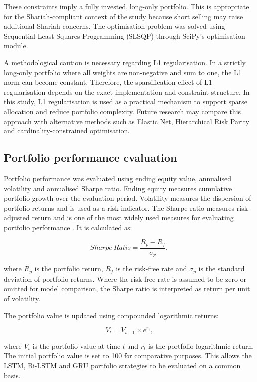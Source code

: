 These constraints imply a fully invested, long-only portfolio. This is appropriate for the Shariah-compliant context of the study because short selling may raise additional Shariah concerns. The optimisation problem was solved using Sequential Least Squares Programming (SLSQP) through SciPy's optimisation module.

A methodological caution is necessary regarding L1 regularisation. In a strictly long-only portfolio where all weights are non-negative and sum to one, the L1 norm can become constant. Therefore, the sparsification effect of L1 regularisation depends on the exact implementation and constraint structure. In this study, L1 regularisation is used as a practical mechanism to support sparse allocation and reduce portfolio complexity. Future research may compare this approach with alternative methods such as Elastic Net, Hierarchical Risk Parity and cardinality-constrained optimisation.

\subsection{Portfolio performance evaluation}

Portfolio performance was evaluated using ending equity value, annualised volatility and annualised Sharpe ratio. Ending equity measures cumulative portfolio growth over the evaluation period. Volatility measures the dispersion of portfolio returns and is used as a risk indicator. The Sharpe ratio measures risk-adjusted return and is one of the most widely used measures for evaluating portfolio performance \citep{sharpe1966mutual}. It is calculated as:

\begin{equation}
Sharpe\ Ratio = \frac{R_p - R_f}{\sigma_p},
\end{equation}

\noindent where $R_p$ is the portfolio return, $R_f$ is the risk-free rate and $\sigma_p$ is the standard deviation of portfolio returns. Where the risk-free rate is assumed to be zero or omitted for model comparison, the Sharpe ratio is interpreted as return per unit of volatility.

The portfolio value is updated using compounded logarithmic returns:

\begin{equation}
V_t = V_{t-1} \times e^{r_t},
\end{equation}

\noindent where $V_t$ is the portfolio value at time $t$ and $r_t$ is the portfolio logarithmic return. The initial portfolio value is set to 100 for comparative purposes. This allows the LSTM, Bi-LSTM and GRU portfolio strategies to be evaluated on a common basis.

